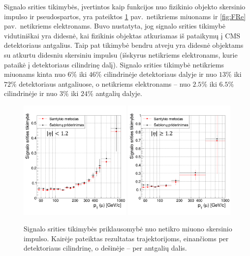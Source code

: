 \documentclass[a4paper, 12pt, oneside]{article}
\begin{document}
Signalo srities tikimybės, įvertintos kaip funkcijos nuo fizikinio objekto skersinio impulso ir pseudospartos,
yra pateiktos \ref{fig:FRmu} pav.\ netikriems miuonams ir \ref{fig:FRe} pav.\ netikriems elektronams.
Buvo nustatyta, jog signalo srities tikimybė vidutiniškai yra didesnė, kai fizikinis objektas atkuriamas iš pataikymų į
CMS detektoriaus antgalius.
Taip pat tikimybė bendru atveju yra didesnė objektams su atkurtu didesniu skersiniu impulsu (išskyrus netikriems elektronams,
kurie pataikė į detektoriaus cilindrinę dalį).
Signalo srities tikimybė netikriems miuonams kinta nuo $6\%$ iki $46\%$ cilindrinėje detektoriaus dalyje ir nuo $13\%$ iki
$72\%$ detektoriaus antgaliuose, o netikriems elektronams -- nuo $2.5\%$ iki $6.5\%$ cilindrinėje ir nuo $3\%$ iki $24\%$ antgalių dalyje.

\begin{figure}[t!]
	\RawFloats
	\includegraphics[width=0.49\textwidth]{Magistrinis/FRmu_barrel.png}
	\includegraphics[width=0.49\textwidth]{Magistrinis/FRmu_endcap.png}
	\caption{\label{fig:FRmu}
		Signalo srities tikimybės priklausomybė nuo netikro miuono skersinio impulso.
		Kairėje pateiktas rezultatas trajektorijoms, einančioms per detektoriaus cilindrinę, o dešinėje -- per antgalių dalis.
}
\end{figure}
\end{document}
